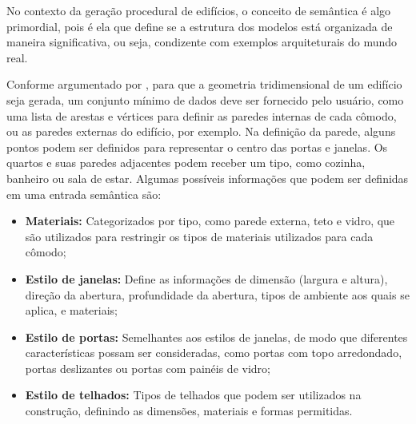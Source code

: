 \begin{figure}[h!]
	\centering
	\captionsetup{width=15cm}
	{}
\end{figure}

No contexto da geração procedural de edifícios, o conceito de semântica é algo primordial, pois é ela que define se a estrutura dos modelos está organizada de maneira significativa, ou seja, condizente com exemplos arquiteturais do mundo real.

Conforme argumentado por , para que a geometria tridimensional de um edifício seja gerada, um conjunto mínimo de dados deve ser fornecido pelo usuário, como uma lista de arestas e vértices para definir as paredes internas de cada cômodo, ou as paredes externas do edifício, por exemplo. Na definição da parede, alguns pontos podem ser definidos para representar o centro das portas e janelas. Os quartos e suas paredes adjacentes podem receber um tipo, como cozinha, banheiro ou sala de estar. Algumas possíveis informações que podem ser definidas em uma entrada semântica são:

\begin{itemize}
    \item \textbf{Materiais:} Categorizados por tipo, como parede externa, teto e vidro, que são utilizados para restringir os tipos de materiais utilizados para cada cômodo;
    
    \item \textbf{Estilo de janelas:} Define as informações de dimensão (largura e altura), direção da abertura, profundidade da abertura, tipos de ambiente aos quais se aplica, e materiais;
    
    \item \textbf{Estilo de portas:} Semelhantes aos estilos de janelas, de modo que diferentes características possam ser consideradas, como portas com topo arredondado, portas deslizantes ou portas com painéis de vidro;
    
    \item \textbf{Estilo de telhados:} Tipos de telhados que podem ser utilizados na construção, definindo as dimensões, materiais e formas permitidas.
\end{itemize}

